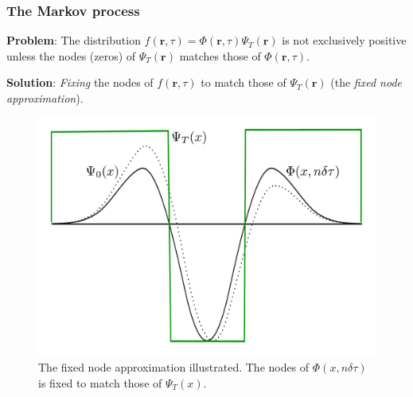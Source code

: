 %  
%  
%  
%  
%  


\begin{frame}

 \frametitle{The Markov process}

 
 \textbf{Problem}: The distribution $f(\mathbf{r}, \tau) = \Phi(\mathbf{r}, \tau)\Psi_T(\mathbf{r})$ is not exclusively positive unless the nodes (zeros) of $\Psi_T(\mathbf{r})$ matches those of $\Phi(\mathbf{r}, \tau)$. 
 \shift
 
 \textbf{Solution}: \emph{Fixing} the nodes of $f(\mathbf{r}, \tau)$ to match those of $\Psi_T(\mathbf{r})$ (the \textit{fixed node approximation}).
 
\end{frame}

\begin{frame}
\begin{figure}
 \begin{center}
  \includegraphics[scale=0.3]{../graphics/fixxednode.pdf}
 \end{center}
 \caption{The fixed node approximation illustrated. The nodes of $\Phi(x, n\delta\tau)$ is fixed to match those of $\Psi_T(x)$.}
\end{figure}
\end{frame}


